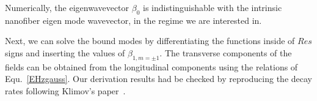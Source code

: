 \documentclass[]{report}
\begin{document}
Numerically, the eigenwavevector $ \beta_0 $ is indistinguishable with the intrinsic nanofiber eigen mode wavevector, in the regime we are interested in.

Next, we can solve the bound modes by differentiating the functions inside of $ Res $ signs and inserting the values of $ \beta_{1,m=\pm 1} $. %
The transverse components of the fields can be obtained from the longitudinal components using the relations of Equ.~\ref{EHzgauss}. 
Our derivation results had be checked by reproducing the decay rates following Klimov's paper~\cite{Klimov2004}. 
\end{document}
